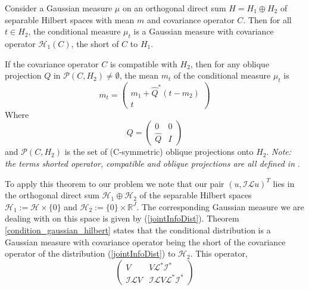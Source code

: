 \begin{theorem}
    \label{condition_gaussian_hilbert}
    Consider a Gaussian measure $\mu$ on an orthogonal direct sum $H=H_{1}\oplus H_{2}$ of separable Hilbert spaces with mean $m$ and covariance operator $C$. Then for all $t\in H_2$, the conditional measure $\mu_{t}$ is a Gaussian measure with covariance operator $\mathcal{H}_{1}(C)$, the short of $C$ to $H_{1}$.

    If the covariance operator $C$ is compatible with $H_2$, then for any oblique projection $Q$ in $\mathcal{P}(C,H_2)\neq\emptyset$, the mean $m_t$ of the conditional measure $\mu_t$ is
    \begin{equation*}
        m_t = \begin{pmatrix}
                m_1 + \hat{Q}^{*}(t-m_2) \\
                t
              \end{pmatrix}
    \end{equation*}
    Where \begin{equation*}
            Q=\begin{pmatrix}
                0 & 0 \\
                \hat{Q} & I
              \end{pmatrix}
          \end{equation*}
   and $\mathcal{P}(C,H_2)$ is the set of (C-symmetric) oblique projections onto $H_2$. \textit{Note: the terms shorted operator, compatible and oblique projections are all defined in} \textcolor{blue}{\citep{owhadi2015conditioning}}.
\end{theorem}
To apply this theorem to our problem we note that our pair $(u,\mathcal{I}\mathcal{L}u)^{T}$ lies in the orthogonal direct sum $\mathcal{H}_{1}\oplus\mathcal{H}_{2}$ of the separable Hilbert spaces $\mathcal{H}_{1}:=\mathcal{H}\times\{0\}$ and $\mathcal{H}_{2}:=\{0\}\times\mathbb{R}^{J}$. The corresponding Gaussian measure we are dealing with on this space is given by (\ref{jointInfoDist}). Theorem \textcolor{blue}{\ref{condition_gaussian_hilbert}} states that the conditional distribution is a Gaussian measure with covariance operator being the short of the covariance operator of the distribution (\ref{jointInfoDist}) to $\mathcal{H}_{2}$. This operator,
\begin{equation*}
    \begin{pmatrix}
        V & V\mathcal{L}^{*}\mathcal{I}^{*} \\
        \mathcal{I}\mathcal{L}V & \mathcal{I}\mathcal{L}V\mathcal{L}^{*}\mathcal{I}^{*}
    \end{pmatrix}
\end{equation*}
